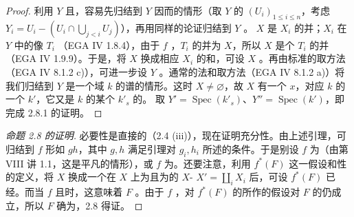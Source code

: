 \begin{proof}
利用 $Y$ 且，容易先归结到 $Y$ 因而的情形（取 $Y$ 的 $(U_i)_{1\le i\le n}$，考虑 $Y_i=U_i-(U_i\cap\bigcup_{j<i}U_j)$），再用同样的论证归结到 $Y$ 。 $X$ 是 $X_i$ 的并；$X_i$ 在 $Y$ 中的像 $T_i$ （EGA IV 1.8.4），由于 $f$ ，$T_i$ 的并为 $X$，所以 $X$ 是个 $T_i$ 的并（EGA IV 1.9.9）。于是，将 $X$ 换成相应 $X_i$ 的和，可设 $X$ 。再由标准的取方法（EGA IV 8.1.2 c)），可进一步设 $Y$ 。通常的法和取方法（EGA IV 8.1.2 a)）将我们归结到 $Y$ 是一个域 $k$ 的谱的情形。这时 $X\ne\varnothing$，故 $X$ 有一个 $x$，对应 $k$ 的一个 $k'$，它又是 $k$ 的某个 $k'_s$ 的。
取 $Y'=\operatorname{Spec}(k'_s)$、$Y''=\operatorname{Spec}(k')$，即完成 2.8.1 的证明。
\end{proof}
\begin{proof}[命题 2.8 的证明]
必要性是直接的（2.4 (iii)），现在证明充分性。由上述引理，可归结到 $f$ 形如 $gh$，其中 $g,h$ 满足引理对 $g_i,h_i$ 所述的条件。于是别设 $f$ 为（由第 VIII 讲 1.1，这是平凡的情形），或 $f$ 为。还要注意，利用 $f^*(F)$ 这一假设和性的定义，将 $X$ 换成一个在 $X$ 上为且为的 $X$- $X'=\coprod_iX_i$ 后，可设 $f^*(F)$ 已经。而当 $f$ 且时，这意味着 $F$ 。由于 $f$ ，对 $f^*(F)$ 的所作的假设对 $F$ 的仍成立，所以 $F$ 确为，2.8 得证。
\end{proof}
